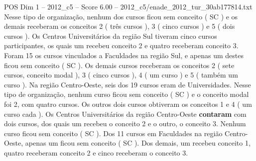 \begin{textsample}{POS Dim 1 – 2012\_c5 – Score 6.00 – 2012\_c5/enade\_2012\_tur\_30ab177814.txt}
Nesse tipo de organização, nenhum dos cursos ficou sem conceito ( SC ) e os demais receberam os conceitos 2 ( três cursos ), 3 ( cinco cursos ) e 5 ( dois cursos ).
Os Centros Universitários da região Sul tiveram cinco cursos participantes, os quais um recebeu conceito 2 e quatro receberam conceito 3.
Foram 15 os cursos vinculados a Faculdades na região Sul, e apenas um destes ficou sem conceito ( SC ).
Os demais cursos receberam os conceitos 2 ( sete cursos, conceito modal ), 3 ( cinco cursos ), 4 ( um curso ) e 5 ( também um curso ).
Na região Centro-Oeste, seis dos 19 cursos eram de Universidades.
Nesse tipo de organização, nenhum curso ficou sem conceito ( SC ) e o conceito modal foi 2, com quatro cursos.
Os outros dois cursos obtiveram os conceitos 1 e 4 ( um curso cada ).
Os Centros Universitários da região Centro-Oeste \textbf{contaram} com dois cursos, dos quais um recebeu o conceito 2 e o outro, o conceito 3.
Nenhum curso ficou sem conceito ( SC ).
Dos 11 cursos em Faculdades na região Centro-Oeste, apenas um ficou sem conceito ( SC ).
Dos demais, um recebeu conceito 1, quatro receberam conceito 2 e cinco receberam o conceito 3.

\end{textsample}
